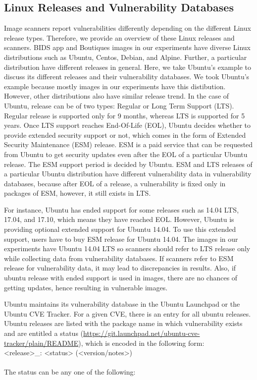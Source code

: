 \documentclass[a4paper,num-refs]{oup-contemporary}
\begin{document}
\subsection{Linux Releases and Vulnerability Databases}

Image scanners report vulnerabilities differently depending on the different Linux release types.
Therefore, we provide an overview of these Linux releases and scanners. 
BIDS app and Boutiques images in our experiments have diverse Linux
distributions such as Ubuntu, Centos, Debian, and Alpine. Further, a particular
distribution have different releases in general. Here, we take Ubuntu's example
to discuss its different releases and their vulnerability databases. We took Ubuntu's example
because mostly images in our experiments have this distibution. However, other distributions also have
similar release trend. In the case of Ubuntu, release
can be of two types: Regular or Long Term Support (LTS).
Regular release is supported only for 9 months, whereas LTS is supported for 5 years. Once LTS support
reaches End-Of-Life (EOL), Ubuntu decides whether to provide extended security support or not, which comes
in the form of Extended Security Maintenance (ESM) release.
ESM is a paid service that can be requested from Ubuntu to get security 
updates even after the EOL of a particular Ubuntu release. The ESM support period is decided by
Ubuntu. ESM and LTS releases of a particular Ubuntu distribution have different vulnerability
data in vulnerability databases, because after EOL of a release, a vulnerability is fixed only in packages of ESM, however, it still
exists in LTS.

For instance, Ubuntu has ended support for some releases such as 14.04 LTS,
17.04, and 17.10, which means they have reached EOL. However, Ubuntu is providing optional extended support for Ubuntu 14.04.
To use this extended support, users have to buy ESM release for Ubuntu 14.04.
The images in our experiments have Ubuntu 14.04 LTS so scanners should refer
to LTS release only while collecting data from vulnerability databases. If scanners refer to ESM release for 
vulnerability data, it may lead to discrepancies in results.
Also, if ubuntu release with ended support is used in images, there are no chances of getting updates, hence
resulting in vulnerable images. 

Ubuntu maintains its vulnerability database in the Ubuntu Launchpad or the Ubuntu CVE Tracker. For a given CVE, there is an entry for all ubuntu releases.
Ubuntu releases are listed with the package name
in which vulnerability exists and are entitled a status
(\href{https://git.launchpad.net/ubuntu-cve-tracker/plain/README}{https://git.launchpad.net/ubuntu-cve-tracker/plain/README}), which is
encoded in the following form:
\newline \\
\noindent <release>\_<source-package>: <status> (<version/notes>) \\
\newline\\
The status can be any one of the following:
\end{document}
